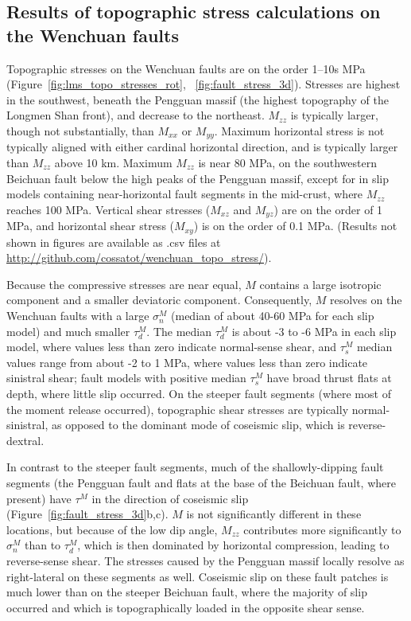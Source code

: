 \documentclass[draft,jgrga]{AGUTeX}
\begin{document}
\begin{article}
\section{Results of topographic stress calculations on the Wenchuan
faults}\label{results-of-topographic-stress-calculations-on-the-wenchuan-faults}

Topographic stresses on the Wenchuan faults are on the order 1--10s MPa
(Figure~\ref{fig:lms_topo_stresses_rot}, ~\ref{fig:fault_stress_3d}). 
Stresses are highest in the southwest,
beneath the Pengguan massif (the highest topography of the Longmen Shan
front), and decrease to the northeast. $M_{zz}$ is typically larger,
though not substantially, than $M_{xx}$ or $M_{yy}$. Maximum horizontal
stress is not typically aligned with either cardinal horizontal
direction, and is typically larger than $M_{zz}$ above 10 km. Maximum
$M_{zz}$ is near 80 MPa, on the southwestern Beichuan fault below the
high peaks of the Pengguan massif, except for in slip models containing
near-horizontal fault segments in the mid-crust, where $M_{zz}$ reaches
100 MPa. Vertical shear stresses ($M_{xz}$ and $M_{yz}$) are on the
order of 1 MPa, and horizontal shear stress ($M_{xy}$) is on the order
of 0.1 MPa. (Results not shown in figures are available as .csv files
at \url{http://github.com/cossatot/wenchuan_topo_stress/}).

Because the compressive stresses are near equal, $M$ contains a large
isotropic component and a smaller deviatoric component. Consequently, $M$
resolves on the Wenchuan faults with a large $\sigma^M_n$ (median of
about 40-60 MPa for each slip model) and much smaller $\tau^M_d$. The
median $\tau^M_d$ is about -3 to -6 MPa in each slip model, where values
less than zero indicate normal-sense shear, and $\tau^M_s$ median values
range from about -2 to 1 MPa, where values less than zero indicate
sinistral shear; fault models with positive median $\tau^M_s$ have broad
thrust flats at depth, where little slip occurred. On the steeper fault
segments (where most of the moment release occurred), topographic shear
stresses are typically normal-sinistral, as opposed to the dominant mode
of coseismic slip, which is reverse-dextral.

In contrast to the steeper fault segments, much of the shallowly-dipping
fault segments (the Pengguan fault and flats at the base of the Beichuan
fault, where present) have $\tau^M$ in the direction of coseismic slip
(Figure~\ref{fig:fault_stress_3d}b,c).
$M$ is not significantly different in these
locations, but because of the low dip angle, $M_{zz}$ contributes more
significantly to $\sigma^M_n$ than to $\tau^M_d$, which is then
dominated by horizontal compression, leading to reverse-sense shear.
The stresses caused by the Pengguan massif locally resolve
as right-lateral on these segments as well. Coseismic slip on these
fault patches is much lower than on the steeper Beichuan fault, where
the majority of slip occurred and which is topographically loaded in the
opposite shear sense.


\end{article}
\end{document}
